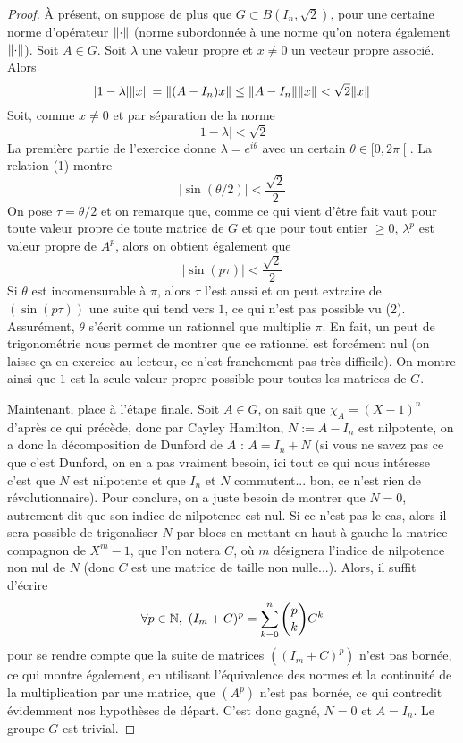 \documentclass[10pt]{scrartcl}
\begin{document}
\begin{proof}
        À présent, on suppose de plus que $G\subset B(I_n,\sqrt2)$, pour une certaine 
        norme d'opérateur $\lVert \cdot\rVert$ (norme subordonnée à une norme qu'on notera 
        également $\lVert \cdot\rVert$). 
        Soit $A\in G$. 
        Soit $\lambda$ une valeur propre et $x\neq 0$ un vecteur propre associé. 
        Alors 
        \[
            |1-\lambda|\lVert x\rVert=\lVert (A-I_n)x\rVert\leq \lVert A-I_n\rVert\lVert x\rVert<\sqrt2\lVert x\rVert
        \]
        Soit, comme $x\neq 0$ et par séparation de la norme 
        \[
            |1-\lambda|<\sqrt2\tag*{(1)}
        \]
        La première partie de l'exercice donne $\lambda=e^{i\theta}$ avec 
        un certain $\theta\in\mathopen[0,2\pi\mathclose[$.
        La relation (1) montre 
        \[
            |\sin(\theta/2)|<\frac{\sqrt2}2
        \]
        On pose $\tau=\theta/2$ et on remarque que, comme ce qui vient d'être fait 
        vaut pour toute valeur propre de toute matrice de $G$ et que pour tout entier 
        $\geq 0$, $\lambda^p$ est valeur propre de $A^p$, alors on obtient également que 
        \[
            |\sin(p\tau)|<\frac{\sqrt2}2\tag*{(2)}
        \]
        Si $\theta$ est incomensurable à $\pi$, alors $\tau$ l'est aussi et  
        on peut extraire de $(\sin(p\tau))$ une suite qui tend vers $1$, ce qui n'est 
        pas possible vu (2).
        Assurément, $\theta$ s'écrit comme un rationnel que multiplie $\pi$. 
        En fait, un peut de trigonométrie nous permet de montrer que ce rationnel est 
        forcément nul (on laisse ça en exercice au lecteur, ce n'est franchement pas 
        très difficile). 
        On montre ainsi que $1$ est la seule valeur propre possible pour toutes les matrices
        de $G$.

        Maintenant, place à l'étape finale.
        Soit $A\in G$, on sait que $\chi_A=(X-1)^n$ d'après ce qui précède, donc par 
        Cayley Hamilton, $N:=A-I_n$ est nilpotente, on a donc la décomposition de Dunford 
        de $A$ : $A=I_n+N$ (si vous ne savez pas ce que c'est Dunford, on en a pas vraiment 
        besoin, ici tout ce qui nous intéresse c'est que $N$ est nilpotente et que $I_n$ et 
        $N$ commutent... bon, ce n'est rien de révolutionnaire).
        Pour conclure, on a juste besoin de montrer que $N=0$, autrement dit que son indice
        de nilpotence est nul. 
        Si ce n'est pas le cas, alors il sera possible de trigonaliser $N$ par blocs en 
        mettant en haut à gauche la matrice compagnon de $X^m-1$, que l'on notera $C$, où
        $m$ désignera l'indice de nilpotence non nul de $N$ (donc $C$ est une
        matrice de taille non nulle...). 
        Alors, il suffit d'écrire
        \[
            \forall p\in\operatorname{\mathbb N},\ (I_m+C)^p=\sum_{k=0}^n\binom pk C^k
        \]
        pour se rendre compte que la suite de matrices $((I_m+C)^p)$ n'est pas bornée, ce
        qui montre également, en utilisant l'équivalence des normes et la continuité de 
        la multiplication par une matrice, que $(A^p)$ n'est pas bornée, ce qui contredit 
        évidemment nos hypothèses de départ. 
        C'est donc gagné, $N=0$ et $A=I_n$. 
        Le groupe $G$ est trivial.
    \end{proof}
\end{document}
